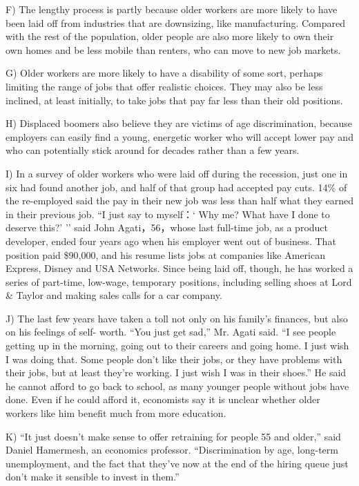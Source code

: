\documentclass[UTF8,11pt]{ctexart}
\begin{document}
F) The lengthy process is partly because older workers are more likely to have been laid off from industries that are downsizing, like manufacturing. Compared with the rest of the population, older people are also more likely to own their own homes and be less mobile than renters, who can move to new job markets.


G) Older workers are more likely to have a disability of some sort, perhaps limiting the range of jobs that offer realistic choices. They may also be less inclined, at least initially, to take jobs that pay far less than their old positions.


H) Displaced boomers also believe they are victims of age discrimination, because employers can easily find a young, energetic worker who will accept lower pay and who can potentially stick around for decades rather than a few years.


I) In a survey of older workers who were laid off during the recession, just one in six had found another job, and half of that group had accepted pay cuts. 14\% of the re-employed said the pay in their new job was less than half what they earned in their previous job. “I just say to myself：‘ Why me? What have I done to deserve this?’ ’’ said John Agati，56，whose last full-time job, as a product developer, ended four years ago when his employer went out of business. That position paid \$90,000, and his resume lists jobs at companies like American Express, Disney and USA Networks. Since being laid off, though, he has worked a series of part-time, low-wage, temporary positions, including selling shoes at Lord \& Taylor and making sales calls for a car company.


J) The last few years have taken a toll not only on his family’s finances, but also on his feelings of self- worth. “You just get sad,” Mr. Agati said. “I see people getting up in the morning, going out to their careers and going home. I just wish I was doing that. Some people don’t like their jobs, or they have problems with their jobs, but at least they’re working. I just wish I was in their shoes.” He said he cannot afford to go back to school, as many younger people without jobs have done. Even if he could afford it, economists say it is unclear whether older workers like him benefit much from more education.


K) “It just doesn’t make sense to offer retraining for people 55 and older,” said Daniel Hamermesh, an economics professor. “Discrimination by age, long-term unemployment, and the fact that they’ve now at the end of the hiring queue just don’t make it sensible to invest in them.”
\end{document}
